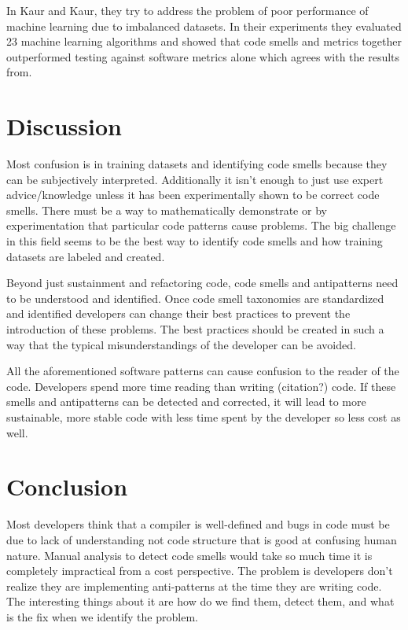 \documentclass[conference]{IEEEtran}
\begin{document}
In Kaur and Kaur\cite{kaur_evaluation_2017}, they try to address the problem of poor performance of machine learning due to imbalanced datasets. In their experiments they evaluated 23 machine learning algorithms  and showed that code smells and metrics together outperformed testing against software metrics alone which agrees with the results from\cite{chernis_machine_2018}.

\section{Discussion}
Most confusion is in training datasets and identifying code smells because they can be subjectively interpreted.
Additionally it isn't enough to just use expert advice/knowledge unless it has been experimentally shown to be correct code smells. 
There must be a way to mathematically demonstrate or by experimentation that particular code patterns cause problems.
The big challenge in this field seems to be the best way to identify code smells and how training datasets are labeled and created.

Beyond just sustainment and refactoring code, code smells and antipatterns need to be understood and identified.
Once code smell taxonomies are standardized and identified developers can change their best practices to prevent the introduction of these problems.
The best practices should be created in such a way that the typical misunderstandings of the developer can be avoided.

All the aforementioned software patterns can cause confusion to the reader of the code. Developers spend more time reading than writing (citation?) code. If these smells and antipatterns can be detected and corrected, it will lead to more sustainable, more stable code with less time spent by the developer so less cost as well.

\section{Conclusion}
Most developers think that a compiler is well-defined and bugs in code must be due to lack of understanding not code structure that is good at confusing human nature.
Manual analysis to detect code smells would take so much time it is completely impractical from a cost perspective.
The problem is developers don't realize they are implementing anti-patterns at the time they are writing code.
The interesting things about it are how do we find them, detect them, and what is the fix when we identify the problem.
\end{document}
